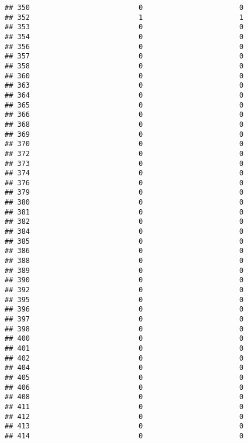 \documentclass[
]{article}
\begin{document}
\begin{verbatim}
## 350                          0                       0
## 352                          1                       1
## 353                          0                       0
## 354                          0                       0
## 356                          0                       0
## 357                          0                       0
## 358                          0                       0
## 360                          0                       0
## 363                          0                       0
## 364                          0                       0
## 365                          0                       0
## 366                          0                       0
## 368                          0                       0
## 369                          0                       0
## 370                          0                       0
## 372                          0                       0
## 373                          0                       0
## 374                          0                       0
## 376                          0                       0
## 379                          0                       0
## 380                          0                       0
## 381                          0                       0
## 382                          0                       0
## 384                          0                       0
## 385                          0                       0
## 386                          0                       0
## 388                          0                       0
## 389                          0                       0
## 390                          0                       0
## 392                          0                       0
## 395                          0                       0
## 396                          0                       0
## 397                          0                       0
## 398                          0                       0
## 400                          0                       0
## 401                          0                       0
## 402                          0                       0
## 404                          0                       0
## 405                          0                       0
## 406                          0                       0
## 408                          0                       0
## 411                          0                       0
## 412                          0                       0
## 413                          0                       0
## 414                          0                       0

\end{verbatim}
\end{document}
